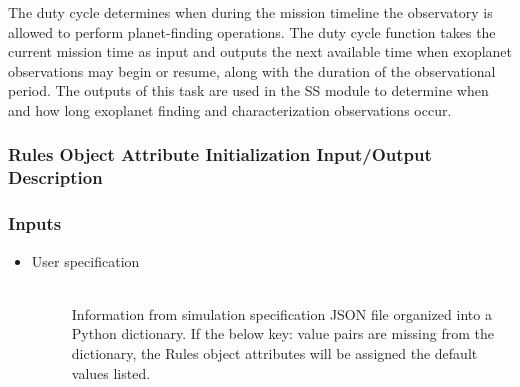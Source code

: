 \documentclass[cleanfoot]{asme2ej}
\begin{document}
The duty cycle determines when during the mission timeline the observatory is allowed to perform planet-finding operations.  The duty cycle function takes the current mission time as input and outputs the next available time when exoplanet observations may begin or resume, along with the duration of the observational period. The outputs of this task are used in the SS module to determine when and how long exoplanet finding and characterization observations occur.  
\label{sec:rules}
\subsubsection{Rules Object Attribute Initialization Input/Output Description}

\subsubsection*{Inputs}
\begin{itemize}
    \item
    \begin{description}
        \item[User specification] \hfill \\
        Information from simulation specification JSON file organized into a Python dictionary. If the below key: value pairs are missing from the dictionary, the Rules object attributes will be assigned the default values listed.
    \end{description}
\end{itemize}
\end{document}
